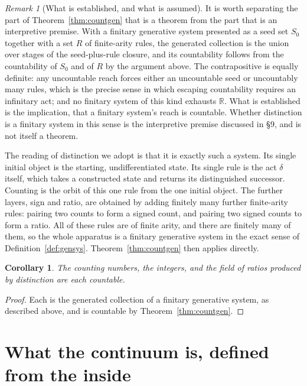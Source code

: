 \documentclass[11pt,a4paper]{article}
\newtheorem{corollary}[theorem]{Corollary}
\theoremstyle{definition}
\theoremstyle{remark}
\newtheorem*{remark}{Remark}
\begin{document}
\begin{remark}[What is established, and what is assumed]
It is worth separating the part of Theorem~\ref{thm:countgen} that is a theorem
from the part that is an interpretive premise. With a finitary generative system
presented as a seed set $S_0$ together with a set $R$ of finite-arity rules, the
generated collection is the union over stages of the seed-plus-rule closure, and
its countability follows from the countability of $S_0$ and of $R$ by the argument
above. The contrapositive is equally definite: any uncountable reach forces either
an uncountable seed or uncountably many rules, which is the precise sense in which
escaping countability requires an infinitary act; and no finitary system of this
kind exhausts $\mathbb R$. What is established is the implication, that a finitary
system's reach is countable. Whether distinction is a finitary system in this sense
is the interpretive premise discussed in \S9, and is not itself a theorem.
\end{remark}

The reading of distinction we adopt is that it is exactly such a system. Its
single initial object is the starting, undifferentiated state. Its single rule is
the act $\delta$ itself, which takes a constructed state and returns its
distinguished successor. Counting is the orbit of this one rule from the one
initial object. The further layers, sign and ratio, are obtained by adding
finitely many further finite-arity rules: pairing two counts to form a signed
count, and pairing two signed counts to form a ratio. All of these rules are of
finite arity, and there are finitely many of them, so the whole apparatus is a
finitary generative system in the exact sense of Definition~\ref{def:gensys}.
Theorem~\ref{thm:countgen} then applies directly.

\begin{corollary}\label{cor:layercount}
The counting numbers, the integers, and the field of ratios produced by
distinction are each countable.
\end{corollary}

\begin{proof}
Each is the generated collection of a finitary generative system, as described
above, and is countable by Theorem~\ref{thm:countgen}.
\end{proof}

\section{What the continuum is, defined from the inside}
\end{document}

